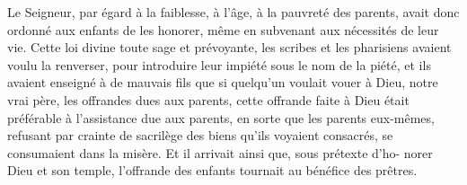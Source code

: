 Le Seigneur, par égard à la faiblesse, à l’âge, à la pauvreté des parents, avait donc ordonné aux enfants de les honorer, même en subvenant aux nécessités de leur vie. Cette loi divine toute sage et prévoyante, les scribes et les pharisiens avaient voulu la renverser, pour introduire leur impiété sous le nom de la piété, et ils avaient enseigné à de mauvais fils que si quelqu’un voulait vouer à Dieu, notre vrai père, les offrandes dues aux parents, cette offrande faite à Dieu était préférable à l’assistance due aux parents, en sorte que les parents eux-mêmes, refusant par crainte de sacrilège des biens qu’ils voyaient consacrés, se consumaient dans la misère. Et il arrivait ainsi que, sous prétexte d’ho- norer Dieu et son temple, l’offrande des enfants tournait au bénéfice des prêtres.
